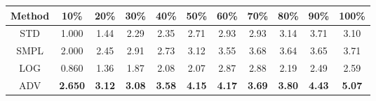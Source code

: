 \documentclass{standalone}
\begin{document}
\begin{tabular}{c|cccccccccc}
      \toprule
      Method & 10\% & 20\% & 30\% & 40\% & 50\% & 60\% & 70\% & 80\% & 90\% & 100\% \\
      \midrule
STD & 1.000 & 1.44 & 2.29 & 2.35 & 2.71 & 2.93 & 2.93 & 3.14 & 3.71 & 3.10\\
SMPL & 2.000 & 2.45 & 2.91 & 2.73 & 3.12 & 3.55 & 3.68 & 3.64 & 3.65 & 3.71\\
LOG & 0.860 & 1.36 & 1.87 & 2.08 & 2.07 & 2.87 & 2.88 & 2.19 & 2.49 & 2.59\\
ADV & \textbf{2.650} & \textbf{3.12} & \textbf{3.08} & \textbf{3.58} & \textbf{4.15} & \textbf{4.17} & \textbf{3.69} & \textbf{3.80} & \textbf{4.43} & \textbf{5.07}\\
  \bottomrule
\end{tabular}
\end{document}

